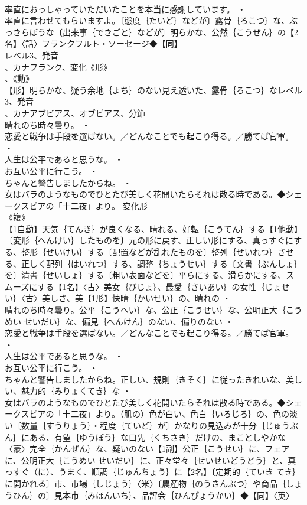 \documentclass[8pt]{extreport}
\begin{document}
\begin{CJK}{UTF8}{min}
\\	率直におっしゃっていただいたことを本当に感謝しています。 ・
\\	率直に言わせてもらいますよ。〔態度｛たいど｝などが〕露骨｛ろこつ｝な、ぶっきらぼうな〔出来事｛できごと｝などが〕明らかな、公然｛こうぜん｝の【2名】〈話〉フランクフルト・ソーセージ◆【同】
\\	レベル3、発音
\\	、カナフランク、変化《形》
\\	、《動》
\\	【形】明らかな、疑う余地｛よち｝のない見え透いた、露骨｛ろこつ｝なレベル3、発音
\\	、カナアブビアス、オブビアス、分節
\\	晴れのち時々曇り。 ・
\\	恋愛と戦争は手段を選ばない。／どんなことでも起こり得る。／勝てば官軍。 ・
\\	人生は公平であると思うな。 ・
\\	お互い公平に行こう。 ・
\\	ちゃんと警告しましたからね。 ・
\\	女はバラのようなものでひとたび美しく花開いたらそれは散る時である。◆シェークスピアの「十二夜」より。	変化形 
\\	《複》
\\	【1自動】天気｛てんき｝が良くなる、晴れる、好転｛こうてん｝する【1他動】〔変形｛へんけい｝したものを〕元の形に戻す、正しい形にする、真っすぐにする、整形｛せいけい｝する〔配置などが乱れたものを〕整列｛せいれつ｝させる、正しく配列｛はいれつ｝する、調整｛ちょうせい｝する〔文書｛ぶんしょ｝を〕清書｛せいしょ｝する〔粗い表面などを〕平らにする、滑らかにする、スムーズにする【1名】〈古〉美女｛びじょ｝、最愛｛さいあい｝の女性｛じょせい｝〈古〉美しさ、美【1形】快晴｛かいせい｝の、晴れの ・
\\	晴れのち時々曇り。公平｛こうへい｝な、公正｛こうせい｝な、公明正大｛こうめい せいだい｝な、偏見｛へんけん｝のない、偏りのない ・
\\	恋愛と戦争は手段を選ばない。／どんなことでも起こり得る。／勝てば官軍。 ・
\\	人生は公平であると思うな。 ・
\\	お互い公平に行こう。 ・
\\	ちゃんと警告しましたからね。正しい、規則｛きそく｝に従ったきれいな、美しい、魅力的｛みりょくてき｝な ・
\\	女はバラのようなものでひとたび美しく花開いたらそれは散る時である。◆シェークスピアの「十二夜」より。（肌の）色が白い、色白｛いろじろ｝の、色の淡い〔数量｛すうりょう｝・程度｛ていど｝が〕かなりの見込みが十分｛じゅうぶん｝にある、有望｛ゆうぼう｝な口先｛くちさき｝だけの、まことしやかな〈豪〉完全｛かんぜん｝な、疑いのない【1副】公正｛こうせい｝に、フェアに、公明正大｛こうめい せいだい｝に、正々堂々｛せいせいどうどう｝と、真っすぐ（に）、うまく、順調｛じゅんちょう｝に【2名】〔定期的｛ていき てき｝に開かれる〕市、市場｛しじょう｝〈米〉〔農産物｛のうさんぶつ｝や商品｛しょうひん｝の〕見本市｛みほんいち｝、品評会｛ひんぴょうかい｝◆【同】〈英〉

\end{CJK}
\end{document}
